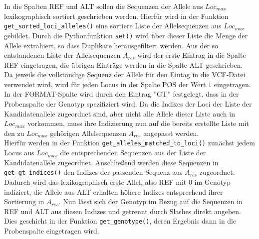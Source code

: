 In die Spalten REF und ALT sollen die Sequenzen der Allele aus $Loc_{max}$ lexikographisch sortiert geschrieben werden. Hierfür wird in der Funktion \lstinline|get_sorted_loci_alleles()| eine sortiere Liste der Allelsequenzen aus $Loc_{max}$ gebildet. Durch die Pythonfunktion \lstinline|set()| wird über dieser Liste die Menge der Allele extrahiert, so dass Duplikate herausgefiltert werden. Aus der so entstandenen Liste der Allelsequenzen $A_{res}$ wird der erste Eintrag in die Spalte REF eingetragen, die übrigen Einträge werden in die Spalte ALT geschrieben.\\

Da jeweils die vollständige Sequenz der Allele für den Eintag in die VCF-Datei verwendet wird, wird für jeden Locus in der Spalte POS der Wert $1$ eingetragen. \\

In der FORMAT-Spalte wird durch den Eintrag ''GT'' festgelegt, dass in der Probenspalte der Genotyp spezifiziert wird. Da die Indizes der Loci der Liste der Kandidatenallele zugeordnet sind, aber nicht alle Allele dieser Liste auch in $Loc_{max}$ vorkommen, muss ihre Indizierung nun auf die bereits erstellte Liste mit den zu $Loc_{max}$ gehörigen Allelsequenzen $A_{res}$ angepasst werden. \\

Hierfür werden in der Funktion \lstinline|get_alleles_matched_to_loci()| zunächst jedem Locus aus $Loc_{max}$ die entsprechenden Sequenzen aus der Liste der Kandidatenallele zugeordnet. Anschließend werden diese Sequenzen in \lstinline|get_gt_indices()| den Indizes der passenden Sequenz aus $A_{res}$ zugeordnet. Dadurch wird das lexikographisch erste Allel, also REF mit 0 im Genotyp indiziert, die Allele aus ALT erhalten höhere Indizes entsprechend ihrer Sortierung in $A_{res}$. Nun lässt sich der Genotyp im Bezug auf die Sequenzen in REF und ALT aus diesen Indizes und getrennt durch Slashes direkt angeben. Dies geschieht in der Funktion \lstinline|get_genotype()|, deren Ergebnis dann in die Probenspalte eingetragen wird.\\


